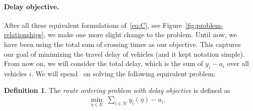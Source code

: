 \documentclass[a4paper]{report}
\theoremstyle{definition}
\newtheorem{define}{Definition}[chapter]
\theoremstyle{plain}
\begin{document}
\paragraph{Delay objective.}

After all these equivalent formulations of~\eqref{eq:C}, see
Figure~\ref{fig:problem-relationships}, we make one more slight change to the
problem. Until now, we have been using the total sum of crossing times as our
objective. This captures our goal of minimizing the travel delay of vehicles
(and it kept notation simple). From now on, we will consider the total delay,
which is the sum of $y_i - a_i$ over all vehicles $i$.
%
We will spend~ on solving the following equivalent
problem:

\begin{mdframed}[%
  innertopmargin=0.3em,
  innerbottommargin=0.9em,
  skipabove=1.5em,
  skipbelow=4em,
]
\begin{define}
  The \emph{route ordering problem with delay objective} is defined as
  \begin{align}
    \label{eq:D}\tag{D}
    \min_{\eta \in E} \; \sum_{i \in \mathcal{N}} y_i(\eta) - a_i .
  \end{align}
\end{define}
\end{mdframed}
\end{document}

